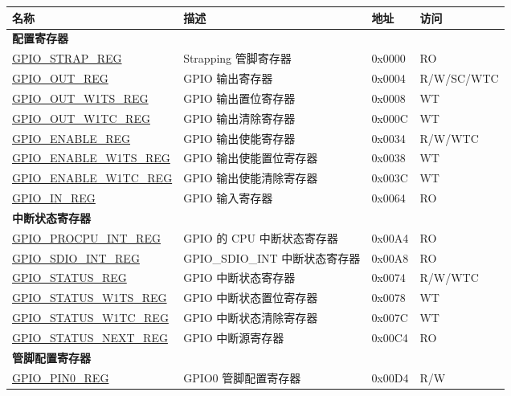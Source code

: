 \begin{longtable}{ | p{6cm} | p{7.2cm} | p{1.3cm} | p{1cm} | }
\hline\rowcolor{lightgray}
\textbf{名称} & \textbf{描述} &  \textbf{地址} & \textbf{访问} \\ \hline
\endhead
\multicolumn{4}{|l|}{\textbf{配置寄存器}} \\ \hline
\hyperref[regdesc:GPIOSTRAPREG]{GPIO\_STRAP\_REG} & Strapping 管脚寄存器 & 0x0000 & RO \\ \hline
\hyperref[regdesc:GPIOOUTREG]{GPIO\_OUT\_REG} & GPIO 输出寄存器 & 0x0004 & R/W/SC/WTC \\ \hline
\hyperref[regdesc:GPIOOUTW1TSREG]{GPIO\_OUT\_W1TS\_REG} & GPIO 输出置位寄存器 & 0x0008 & WT \\ \hline
\hyperref[regdesc:GPIOOUTW1TCREG]{GPIO\_OUT\_W1TC\_REG} & GPIO 输出清除寄存器 & 0x000C & WT \\ \hline
\hyperref[regdesc:GPIOENABLEREG]{GPIO\_ENABLE\_REG} & GPIO 输出使能寄存器 & 0x0034 & R/W/WTC \\ \hline
\hyperref[regdesc:GPIOENABLEW1TSREG]{GPIO\_ENABLE\_W1TS\_REG} & GPIO 输出使能置位寄存器 & 0x0038 & WT \\ \hline
\hyperref[regdesc:GPIOENABLEW1TCREG]{GPIO\_ENABLE\_W1TC\_REG} & GPIO 输出使能清除寄存器 & 0x003C & WT \\ \hline
\hyperref[regdesc:GPIOINREG]{GPIO\_IN\_REG} & GPIO 输入寄存器 & 0x0064 & RO \\ \hline
\multicolumn{4}{|l|}{\textbf{中断状态寄存器}} \\ \hline
\hyperref[regdesc:GPIOPROCPUINTREG]{GPIO\_PROCPU\_INT\_REG} & GPIO 的 CPU 中断状态寄存器 & 0x00A4 & RO \\ \hline
\hyperref[regdesc:GPIOSDIOINTREG]{GPIO\_SDIO\_INT\_REG} & GPIO\_SDIO\_INT 中断状态寄存器 & 0x00A8 & RO \\ \hline
\hyperref[regdesc:GPIOSTATUSREG]{GPIO\_STATUS\_REG} & GPIO 中断状态寄存器 & 0x0074 & R/W/WTC \\ \hline
\hyperref[regdesc:GPIOSTATUSW1TSREG]{GPIO\_STATUS\_W1TS\_REG} & GPIO 中断状态置位寄存器 & 0x0078 & WT \\ \hline
\hyperref[regdesc:GPIOSTATUSW1TCREG]{GPIO\_STATUS\_W1TC\_REG} & GPIO 中断状态清除寄存器 & 0x007C & WT \\ \hline
\hyperref[regdesc:GPIOSTATUSNEXTREG]{GPIO\_STATUS\_NEXT\_REG} & GPIO 中断源寄存器 & 0x00C4 & RO \\ \hline
\multicolumn{4}{|l|}{\textbf{管脚配置寄存器}} \\ \hline
\hyperref[regdesc:GPIOPINNREG]{GPIO\_PIN0\_REG} & GPIO0 管脚配置寄存器 & 0x00D4 & R/W \\ \hline

\end{longtable}
